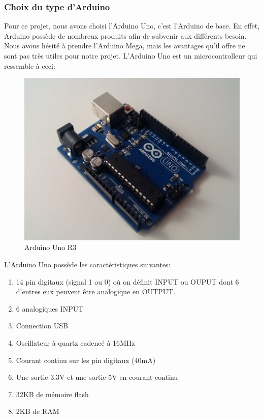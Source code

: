 \documentclass[a4paper,12pt]{article}
\begin{document}
{\subsubsection{Choix du type d'Arduino}
Pour ce projet, nous avons choisi l'Arduino Uno, c'est l'Arduino de base. En effet, Arduino possède de nombreux produits afin de subvenir aux différents besoin. Nous avons hésité à prendre l'Arduino Mega, mais les avantages qu'il offre ne sont pas très utiles pour notre projet. L'Arduino Uno est un microcontrolleur qui ressemble à ceci:\\

\begin{figure}[h]
\begin{center}
\includegraphics[scale=0.38]{arduino_uno.jpg}
\caption{Arduino Uno R3}
\end{center}
\end{figure}
L'Arduino Uno possède les caractéristiques suivantes:
\begin{enumerate}
\item 14 pin digitaux (signal 1 ou 0) où on définit INPUT ou OUPUT dont 6 d'entres eux peuvent être analogique en OUTPUT.
\item  6 analogiques INPUT
\item Connection USB
\item Oscillateur à quartz cadencé à 16MHz
\item Courant continu sur les pin digitaux (40mA)
\item Une sortie 3.3V et une sortie 5V en courant continu
\item 32KB de mémoire flash
\item 2KB de RAM

\end{enumerate}}
\end{document}
